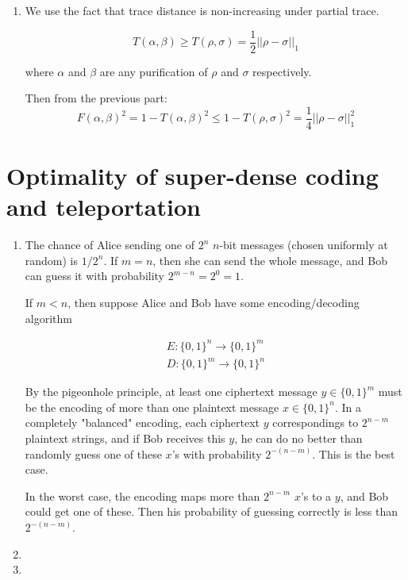 \documentclass[12pt]{article}
\begin{document}
\begin{enumerate}
\item
We use the fact that trace distance is non-increasing under partial trace.

\begin{displaymath}
T(\alpha, \beta) \ge T(\rho, \sigma) = \frac{1}{2} ||\rho - \sigma||_1
\end{displaymath}

where $\alpha$ and $\beta$ are any purification of $\rho$ and $\sigma$
respectively.

Then from the previous part:
\begin{displaymath}
F(\alpha, \beta)^2 = 1 - T(\alpha, \beta)^2 \le 1 - T(\rho, \sigma)^2 =
\frac{1}{4} || \rho - \sigma ||^2_1
\end{displaymath}

\end{enumerate}

\pagebreak

\setcounter{section}{1}
\section{Optimality of super-dense coding and teleportation}

\begin{enumerate}

\item
The chance of Alice sending one of $2^n$ $n$-bit messages (chosen uniformly
at random) is $1/2^n$. If $m=n$, then she can send the whole message, and
Bob can guess it with probability $2^{m-n} = 2^0 = 1$.

If $m < n$, then suppose Alice and Bob have some encoding/decoding algorithm

\begin{multline}
E: \{0,1\}^n \rightarrow \{0,1\}^m \\
D: \{0,1\}^m \rightarrow \{0,1\}^n
\end{multline}

By the pigeonhole principle, at least one ciphertext message $y \in \{0,1\}^m$
must be the encoding of more than one plaintext message $x \in \{0,1\}^n$.
In a completely "balanced" encoding, each ciphertext $y$ correspondings to
$2^{n-m}$ plaintext strings, and if Bob receives this $y$, he can do no better
than randomly guess one of these $x$'s with probability $2^{-(n-m)}$. This is the
best case.

In the worst case, the encoding maps more than $2^{n-m}$ $x$'s to a $y$, and
Bob could get one of these. Then his probability of guessing correctly is
less than $2^{-(n-m)}$.

\item

\item

\end{enumerate}
\end{document}
